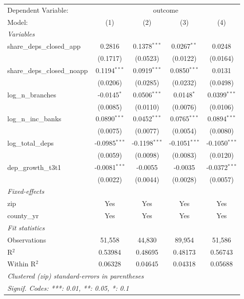 \begingroup
\centering
\begin{tabular}{lcccc}
   \tabularnewline \midrule \midrule
   Dependent Variable: & \multicolumn{4}{c}{outcome}\\
   Model:                        & (1)             & (2)             & (3)             & (4)\\  
   \midrule
   \emph{Variables}\\
   share\_deps\_closed\_app      & 0.2816          & 0.1378$^{***}$  & 0.0267$^{**}$   & 0.0248\\   
                                 & (0.1717)        & (0.0523)        & (0.0122)        & (0.0164)\\   
   share\_deps\_closed\_noapp    & 0.1194$^{***}$  & 0.0919$^{***}$  & 0.0850$^{***}$  & 0.0131\\   
                                 & (0.0206)        & (0.0285)        & (0.0232)        & (0.0498)\\   
   log\_n\_branches              & -0.0145$^{*}$   & 0.0506$^{***}$  & 0.0148$^{*}$    & 0.0399$^{***}$\\   
                                 & (0.0085)        & (0.0110)        & (0.0076)        & (0.0106)\\   
   log\_n\_inc\_banks            & 0.0890$^{***}$  & 0.0452$^{***}$  & 0.0765$^{***}$  & 0.0894$^{***}$\\   
                                 & (0.0075)        & (0.0077)        & (0.0054)        & (0.0080)\\   
   log\_total\_deps              & -0.0985$^{***}$ & -0.1198$^{***}$ & -0.1051$^{***}$ & -0.1050$^{***}$\\   
                                 & (0.0059)        & (0.0098)        & (0.0083)        & (0.0120)\\   
   dep\_growth\_t3t1             & -0.0081$^{***}$ & -0.0055         & -0.0035         & -0.0372$^{***}$\\   
                                 & (0.0022)        & (0.0044)        & (0.0028)        & (0.0057)\\   
   \midrule
   \emph{Fixed-effects}\\
   zip                           & Yes             & Yes             & Yes             & Yes\\  
   county\_yr                    & Yes             & Yes             & Yes             & Yes\\  
   \midrule
   \emph{Fit statistics}\\
   Observations                  & 51,558          & 44,830          & 89,954          & 51,586\\  
   R$^2$                         & 0.53984         & 0.48695         & 0.48173         & 0.56743\\  
   Within R$^2$                  & 0.06328         & 0.04645         & 0.04318         & 0.05688\\  
   \midrule \midrule
   \multicolumn{5}{l}{\emph{Clustered (zip) standard-errors in parentheses}}\\
   \multicolumn{5}{l}{\emph{Signif. Codes: ***: 0.01, **: 0.05, *: 0.1}}\\
\end{tabular}
\par\endgroup
